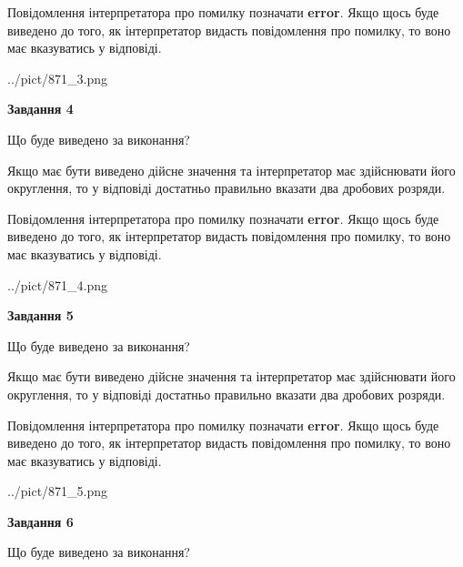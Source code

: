 \documentclass[12pt, ukrainian]{article}
\begin{document}
{\begin {Large}
Повідомлення інтерпретатора про помилку позначати \textbf{error}.
Якщо щось буде виведено до того, як інтерпретатор видасть повідомлення про помилку, 
то воно має вказуватись у відповіді. \par

\begin{center}
	{../pict/871_3.png}
\end{center}
\newpage

{\begin {center}\textbf{Завдання 4}\end {center}}\par
Що буде виведено за виконання? \par

Якщо має бути виведено дійсне значення та інтерпретатор має здійснювати його округлення, 
то у відповіді достатньо правильно вказати два дробових розряди.

Повідомлення інтерпретатора про помилку позначати \textbf{error}.
Якщо щось буде виведено до того, як інтерпретатор видасть повідомлення про помилку, 
то воно має вказуватись у відповіді. \par

\begin{center}
	{../pict/871_4.png}
\end{center}
\newpage

{\begin {center}\textbf{Завдання 5}\end {center}}\par
Що буде виведено за виконання? \par

Якщо має бути виведено дійсне значення та інтерпретатор має здійснювати його округлення, 
то у відповіді достатньо правильно вказати два дробових розряди.

Повідомлення інтерпретатора про помилку позначати \textbf{error}.
Якщо щось буде виведено до того, як інтерпретатор видасть повідомлення про помилку, 
то воно має вказуватись у відповіді. \par

\begin{center}
	{../pict/871_5.png}
\end{center}
\newpage

{\begin {center}\textbf{Завдання 6}\end {center}}\par
Що буде виведено за виконання? \par


\end{Large}}
\end{document}
